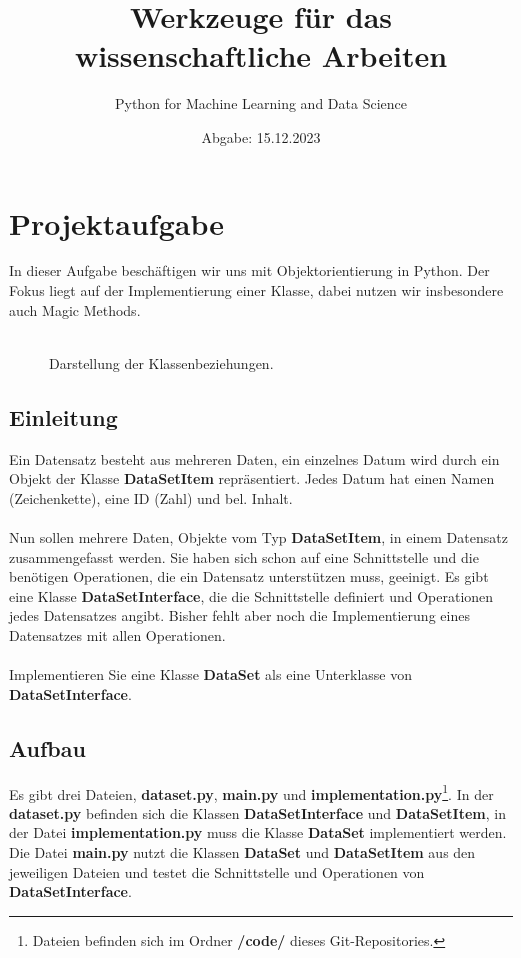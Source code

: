 \documentclass[]{article}
\begin{document}
\title{Werkzeuge für das wissenschaftliche Arbeiten}
\author{Python for Machine Learning and Data Science}
\date{Abgabe: 15.12.2023}
\maketitle

\tableofcontents

\section{Projektaufgabe}
In dieser Aufgabe beschäftigen wir uns mit Objektorientierung in Python.
Der Fokus liegt auf der Implementierung einer Klasse, dabei nutzen wir insbesondere auch Magic Methods.\\
\\

\begin{figure}
	\centering
	
	\caption{Darstellung der Klassenbeziehungen.}
\end{figure}

\subsection{Einleitung}
Ein Datensatz besteht aus mehreren Daten, ein einzelnes Datum wird durch ein Objekt der Klasse \textbf{DataSetItem} repräsentiert.
Jedes Datum hat einen Namen (Zeichenkette), eine ID (Zahl) und bel. Inhalt.\\
\\
Nun sollen mehrere Daten, Objekte vom Typ \textbf{DataSetItem}, in einem Datensatz zusammengefasst werden.
Sie haben sich schon auf eine Schnittstelle und die benötigen Operationen, die ein Datensatz unterstützen muss, geeinigt.
Es gibt eine Klasse \textbf{DataSetInterface}, die die Schnittstelle definiert und Operationen jedes Datensatzes angibt.
Bisher fehlt aber noch die Implementierung eines Datensatzes mit allen Operationen.\\
\\
Implementieren Sie eine Klasse \textbf{DataSet} als eine Unterklasse von \textbf{DataSetInterface}.

\subsection{Aufbau}
Es gibt drei Dateien, \textbf{dataset.py}, \textbf{main.py} und \textbf{implementation.py}\footnote{Dateien befinden sich im Ordner \textbf{/code/} dieses Git-Repositories.}.
In der \textbf{dataset.py} befinden sich die Klassen \textbf{DataSetInterface} und \textbf{DataSetItem},
in der Datei \textbf{implementation.py} muss die Klasse \textbf{DataSet} implementiert werden.
Die Datei \textbf{main.py} nutzt die Klassen \textbf{DataSet} und \textbf{DataSetItem} aus den jeweiligen Dateien und testet die Schnittstelle und Operationen von \textbf{DataSetInterface}.
\end{document}

